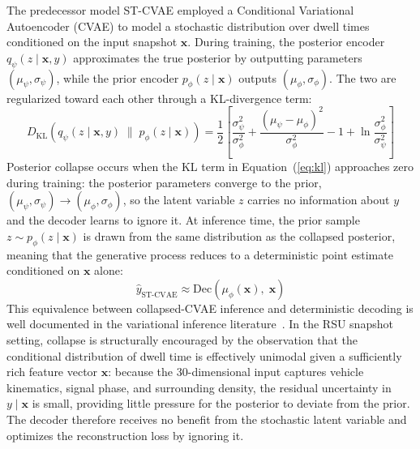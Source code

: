 \documentclass[journal]{IEEEtran}
\begin{document}
The predecessor model ST-CVAE employed a Conditional Variational Autoencoder (CVAE) to model a stochastic distribution over dwell times conditioned on the input snapshot $\mathbf{x}$.
During training, the posterior encoder $q_\psi(z \mid \mathbf{x}, y)$ approximates the true posterior by outputting parameters $(\mu_\psi, \sigma_\psi)$, while the prior encoder $p_\phi(z \mid \mathbf{x})$ outputs $(\mu_\phi, \sigma_\phi)$.
The two are regularized toward each other through a KL-divergence term:
\begin{equation}
D_\text{KL}\!\left(q_\psi(z \mid \mathbf{x}, y) \;\|\; p_\phi(z \mid \mathbf{x})\right) = \frac{1}{2}\!\left[\frac{\sigma_\psi^2}{\sigma_\phi^2} + \frac{(\mu_\psi - \mu_\phi)^2}{\sigma_\phi^2} - 1 + \ln\frac{\sigma_\phi^2}{\sigma_\psi^2}\right]
\label{eq:kl}
\end{equation}
Posterior collapse occurs when the KL term in Equation~(\ref{eq:kl}) approaches zero during training: the posterior parameters converge to the prior, $(\mu_\psi, \sigma_\psi) \to (\mu_\phi, \sigma_\phi)$, so the latent variable $z$ carries no information about $y$ and the decoder learns to ignore it.
At inference time, the prior sample $z \sim p_\phi(z \mid \mathbf{x})$ is drawn from the same distribution as the collapsed posterior, meaning that the generative process reduces to a deterministic point estimate conditioned on $\mathbf{x}$ alone:
\begin{equation}
\hat{y}_\text{ST-CVAE} \approx \text{Dec}\!\left(\mu_\phi(\mathbf{x}),\; \mathbf{x}\right)
\label{eq:collapse}
\end{equation}
This equivalence between collapsed-CVAE inference and deterministic decoding is well documented in the variational inference literature~\cite{posteriorCollapse, vandenOord2017}.
In the RSU snapshot setting, collapse is structurally encouraged by the observation that the conditional distribution of dwell time is effectively unimodal given a sufficiently rich feature vector $\mathbf{x}$: because the 30-dimensional input captures vehicle kinematics, signal phase, and surrounding density, the residual uncertainty in $y \mid \mathbf{x}$ is small, providing little pressure for the posterior to deviate from the prior.
The decoder therefore receives no benefit from the stochastic latent variable and optimizes the reconstruction loss by ignoring it.
\end{document}
